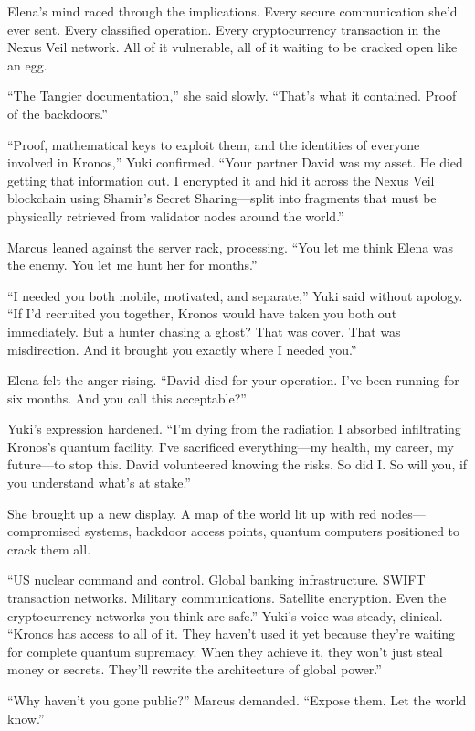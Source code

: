 \documentclass[12pt,letterpaper]{book}
\begin{document}
Elena's mind raced through the implications. Every secure communication she'd ever sent. Every classified operation. Every cryptocurrency transaction in the Nexus Veil network. All of it vulnerable, all of it waiting to be cracked open like an egg.

``The Tangier documentation,'' she said slowly. ``That's what it contained. Proof of the backdoors.''

``Proof, mathematical keys to exploit them, and the identities of everyone involved in Kronos,'' Yuki confirmed. ``Your partner David was my asset. He died getting that information out. I encrypted it and hid it across the Nexus Veil blockchain using Shamir's Secret Sharing---split into fragments that must be physically retrieved from validator nodes around the world.''

Marcus leaned against the server rack, processing. ``You let me think Elena was the enemy. You let me hunt her for months.''

``I needed you both mobile, motivated, and separate,'' Yuki said without apology. ``If I'd recruited you together, Kronos would have taken you both out immediately. But a hunter chasing a ghost? That was cover. That was misdirection. And it brought you exactly where I needed you.''

Elena felt the anger rising. ``David died for your operation. I've been running for six months. And you call this acceptable?''

Yuki's expression hardened. ``I'm dying from the radiation I absorbed infiltrating Kronos's quantum facility. I've sacrificed everything---my health, my career, my future---to stop this. David volunteered knowing the risks. So did I. So will you, if you understand what's at stake.''

She brought up a new display. A map of the world lit up with red nodes---compromised systems, backdoor access points, quantum computers positioned to crack them all.

``US nuclear command and control. Global banking infrastructure. SWIFT transaction networks. Military communications. Satellite encryption. Even the cryptocurrency networks you think are safe.'' Yuki's voice was steady, clinical. ``Kronos has access to all of it. They haven't used it yet because they're waiting for complete quantum supremacy. When they achieve it, they won't just steal money or secrets. They'll rewrite the architecture of global power.''

``Why haven't you gone public?'' Marcus demanded. ``Expose them. Let the world know.''
\end{document}
